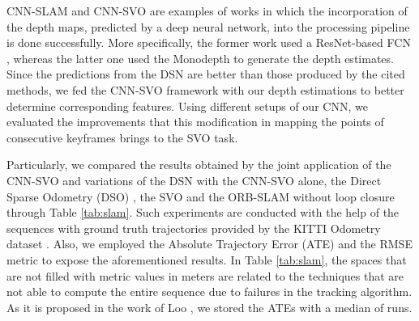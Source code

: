 \documentclass[5p]{elsarticle}
\begin{document}
CNN-SLAM and CNN-SVO \cite{loo2019cnn} are examples of works in which the incorporation of the depth maps, predicted by a deep neural network, into the processing pipeline is done successfully. More specifically, the former work used a ResNet-based FCN \cite{laina2016deeper}, whereas the latter one used the Monodepth \cite{godard2017unsupervised} to generate the depth estimates. Since the predictions from the DSN are better than those produced by the cited methods, we fed the CNN-SVO framework with our depth estimations to better determine corresponding features. Using different setups of our CNN, we evaluated the improvements that this modification in mapping the points of consecutive keyframes brings to the SVO task. 

Particularly, we compared the results obtained by the joint application of the CNN-SVO and variations of the DSN with the CNN-SVO alone, the Direct Sparse Odometry (DSO) \cite{engel2017direct}, the SVO \citep{forster2014svo} and the ORB-SLAM without loop closure \cite{mur2017orb} through Table \ref{tab:slam}. Such experiments are conducted with the help of the  sequences with ground truth trajectories provided by the KITTI Odometry dataset \cite{Geiger2012CVPR}. Also, we employed the Absolute Trajectory Error (ATE) and the RMSE metric to expose the aforementioned results. In Table \ref{tab:slam}, the spaces that are not filled with metric values in meters are related to the techniques that are not able to compute the entire sequence due to failures in the tracking algorithm. As it is proposed in the work of Loo \etal\cite{loo2019cnn}, we stored the ATEs with a median of  runs.
\end{document}
